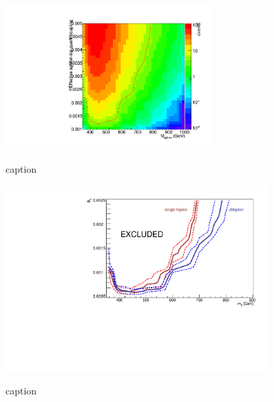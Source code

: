 \begin{figure}[h!]
\centering
    \includegraphics[width=0.7\textwidth]{images/Pheno/SG_nEvents2D.pdf}\\
    \caption{caption}
    \label{fig:dilep2D}
\end{figure}

\begin{figure}[h!]
\centering
    \includegraphics[width=0.9\textwidth]{images/Pheno/exclusion_agVariations.pdf}\\
    \caption{caption}
    \label{fig:sgluonExclusion}
\end{figure}


